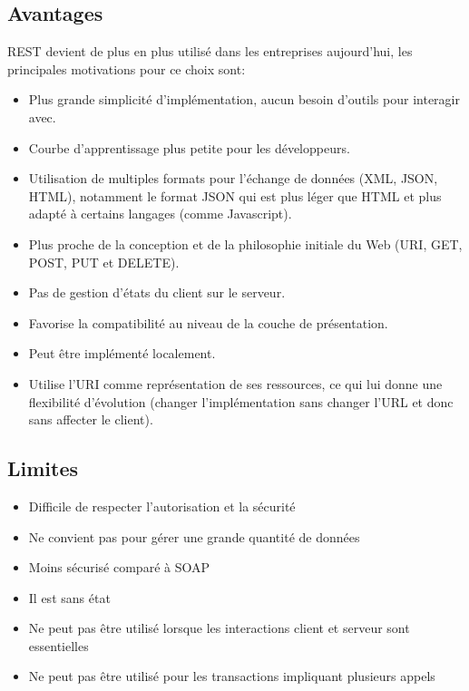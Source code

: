 \subsection{Avantages}
REST devient de plus en plus utilisé dans les entreprises aujourd'hui, les principales motivations pour ce choix sont:\cite{refSOAPvsREST}
\begin{itemize}
	\item Plus grande simplicité d'implémentation, aucun besoin d'outils pour interagir avec.
	\item Courbe d'apprentissage plus petite pour les développeurs.
	\item Utilisation de multiples formats pour l'échange de données (XML, JSON, HTML), notamment le format JSON qui est plus léger que HTML et plus adapté à certains langages (comme Javascript).
	\item Plus proche de la conception et de la philosophie initiale du Web (URI, GET, POST, PUT et DELETE).
	\item Pas de gestion d'états du client sur le serveur.
	\item Favorise la compatibilité au niveau de la couche de présentation.
	\item Peut être implémenté localement.
	\item Utilise l'URI comme représentation de ses ressources, ce qui lui donne une flexibilité d'évolution (changer l'implémentation sans changer l'URL et donc sans affecter le client).
\end{itemize}
\subsection{Limites}
\begin{itemize}
	\item Difficile de respecter l'autorisation et la sécurité
	\item Ne convient pas pour gérer une grande quantité de données
	\item Moins sécurisé comparé à SOAP
	\item Il est sans état
	\item Ne peut pas être utilisé lorsque les interactions client et serveur sont essentielles
	\item Ne peut pas être utilisé pour les transactions impliquant plusieurs appels
\end{itemize}
